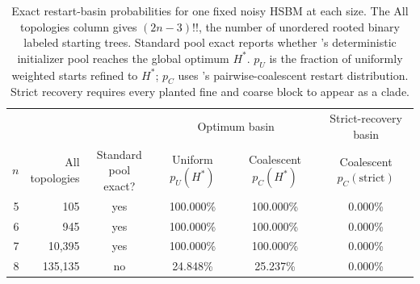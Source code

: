 \begin{table}[t]
\centering
\caption{Exact restart-basin probabilities for one fixed noisy HSBM at each
size. The All topologies column gives $(2n-3)!!$, the number of unordered
rooted binary labeled starting trees. Standard pool exact reports whether \NEST's
deterministic initializer pool reaches the global optimum $H^*$. $p_U$ is the
fraction of uniformly weighted starts refined to $H^*$; $p_C$ uses \NEST's
pairwise-coalescent restart distribution. Strict recovery requires every
planted fine and coarse block to appear as a clade.}
\label{tab:basin-exact}
\small
\begin{tabular*}{\textwidth}{@{\extracolsep{\fill}}rrcccc@{}}
\toprule
& & & \multicolumn{2}{c}{Optimum basin}
& \shortstack{Strict-recovery\\basin} \\
\cmidrule(lr){4-5}
$n$ & \shortstack{All\\topologies}
& \shortstack{Standard pool\\exact?}
& \shortstack{Uniform\\$p_U(H^*)$}
& \shortstack{Coalescent\\$p_C(H^*)$}
& \shortstack{Coalescent\\$p_C(\mathrm{strict})$} \\
\midrule
5 & 105     & yes & 100.000\% & 100.000\% & 0.000\% \\
6 & 945     & yes & 100.000\% & 100.000\% & 0.000\% \\
7 & 10,395  & yes & 100.000\% & 100.000\% & 0.000\% \\
8 & 135,135 & no  &  24.848\% &  25.237\% & 0.000\% \\
\bottomrule
\end{tabular*}
\end{table}
